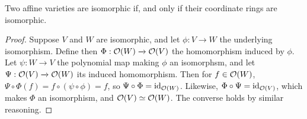 \begin{lemma}\label{lemma_2.1.5}
  Two affine varieties are isomorphic if, and only if their coordinate rings are
  isomorphic.
\end{lemma}
\begin{proof}
  Suppose $V$ and $W$ are isomorphic, and let $\phi:V \xrightarrow{} W$ the
  underlying isomorphism. Define then $\Phi:\mathcal{O}(W) \xrightarrow{} \mathcal{O}(V)$ the
  homomorphism induced by $\phi$. Let $\psi:W \xrightarrow{} V$ the polynomial
  map making $\phi$ an isomorphsm, and let $\Psi:\mathcal{O}(V) \xrightarrow{} \mathcal{O}(W)$
  its induced homomorphism. Then for $f \in \mathcal{O}(W)$, $\Psi \circ \Phi(f)=f \circ
  (\psi \circ \phi)=f$, so $\Psi \circ \Phi=\operatorname{id}_{\mathcal{O}(W)}$. Likewise, $\Phi \circ
  \Psi=\operatorname{id}_{\mathcal{O}(V)}$, which makes $\Phi$ an isomorphism, and $\mathcal{O}(V) \simeq
  \mathcal{O}(W)$. The converse holds by similar reasoning.
\end{proof}
